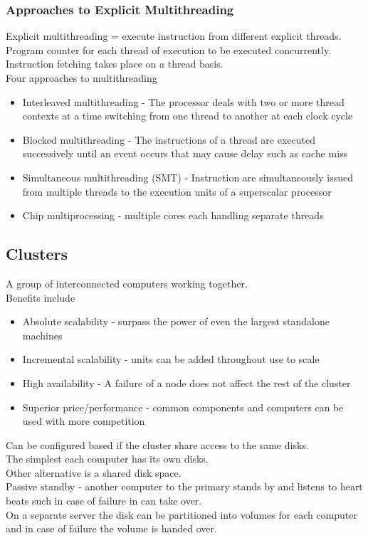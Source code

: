 \documentclass[12pt, a4paper]{article}
\begin{document}
			\subsubsection{Approaches to Explicit Multithreading}
				Explicit multithreading = execute instruction from different explicit threads.\\
				Program counter for each thread of execution to be executed concurrently.\\
				Instruction fetching takes place on a thread basis.\\
				Four approaches to multithreading
				\begin{itemize}
					\item Interleaved multithreading - The processor deals with two or more thread contexts at a time switching from one thread to another at each clock cycle
					\item Blocked multithreading - The instructions of a thread are executed successively until an event occurs that may cause delay such as cache miss
					\item Simultaneous multithreading (SMT) - Instruction are simultaneously issued from multiple threads to the execution units of a superscalar processor
					\item Chip multiprocessing - multiple cores each handling separate threads
				\end{itemize}
		\subsection{Clusters}
			 A group of interconnected computers working together.\\
			 Benefits include
			 \begin{itemize}
			 	\item Absolute scalability - surpass the power of even the largest standalone machines
			 	\item Incremental scalability - units can be added throughout use to scale
			 	\item High availability - A failure of a node does not affect the rest of the cluster
			 	\item Superior price/performance - common components and computers can be used with more competition
			\end{itemize}
			Can be configured based if the cluster share access to the same disks.\\
			The simplest each computer has its own disks.\\
			Other alternative is a shared disk space.\\
			Passive standby - another computer to the primary stands by and listens to heart beats such in case of failure in can take over.\\
			On a separate server the disk can be partitioned into volumes for each computer and in case of failure the volume is handed over.
\end{document}
